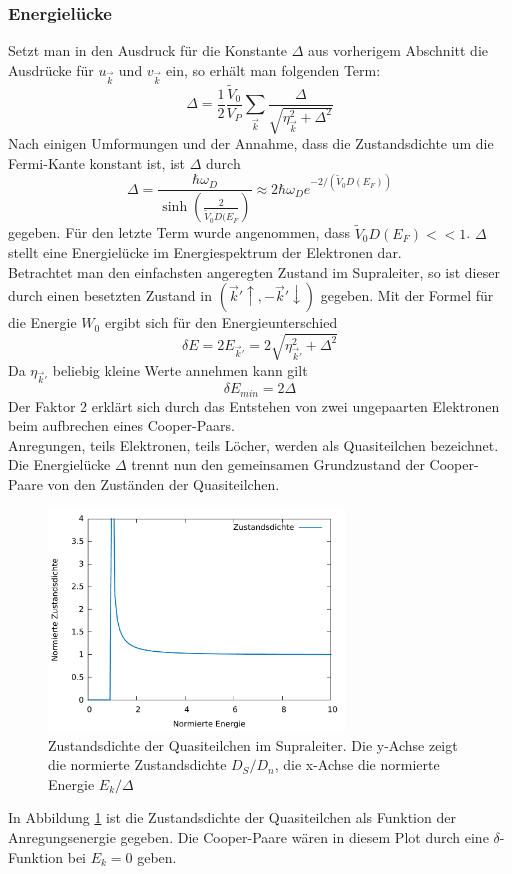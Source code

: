 		\subsubsection{Energielücke}
Setzt man in den Ausdruck für die Konstante $\Delta$ aus vorherigem Abschnitt die
Ausdrücke für $u_{\vec{k}}$ und $v_{\vec{k}}$ ein, so erhält man folgenden Term:
\[
	\Delta = \frac{1}{2} \frac{\tilde{V}_0}{V_P} \sum_{\vec{k}} 
			 \frac{\Delta}{\sqrt{\eta_{\vec{k}}^2 + \Delta^2}}
\]
Nach einigen Umformungen und der Annahme, dass die Zustandsdichte um die Fermi-Kante
konstant ist, ist $\Delta$ durch
\[
	\Delta = \frac{\hbar \omega_D}{\sinh \left( \frac{2}{\tilde{V}_0 D(E_F} \right)}
		   \approx 2 \hbar \omega_D e^{-2 / (\tilde{V}_0 D(E_F))}
\]
gegeben. Für den letzte Term wurde angenommen, dass $\tilde{V}_0 D(E_F) << 1$. 
$\Delta$ stellt eine Energielücke im Energiespektrum der Elektronen dar.\\
Betrachtet man den einfachsten angeregten Zustand im Supraleiter, so ist dieser
durch einen besetzten Zustand in $(\vec{k}' \uparrow, - \vec{k}' \downarrow)$
gegeben. Mit der Formel für die Energie $W_0$ ergibt sich für den 
Energieunterschied
\[
	\delta E = 2 E_{\vec{k}'} = 2 \sqrt{\eta_{\vec{k}'}^2 + \Delta^2}
\]
Da $\eta_{\vec{k}'}$ beliebig kleine Werte annehmen kann gilt 
\[
	\delta E_{min} = 2 \Delta
\]
Der Faktor 2 erklärt sich durch das Entstehen von zwei ungepaarten Elektronen
beim aufbrechen eines Cooper-Paars.\\
Anregungen, teils Elektronen, teils Löcher, werden als Quasiteilchen bezeichnet.
Die Energielücke $\Delta$ trennt nun den gemeinsamen Grundzustand der Cooper-Paare
von den Zuständen der Quasiteilchen.
\begin{figure}[h]
	\centering
	\includegraphics[width=0.7\textwidth]{Abb/plotdos.pdf}
	\caption{Zustandsdichte der Quasiteilchen im Supraleiter. Die y-Achse zeigt 
			 die normierte Zustandsdichte $D_S/D_n$, die x-Achse die normierte
			 Energie $E_k/\Delta$}
	\label{plotdos}
\end{figure}
In Abbildung \ref{plotdos} ist die Zustandsdichte der Quasiteilchen als Funktion
der Anregungsenergie gegeben. Die Cooper-Paare wären in diesem Plot durch eine 
$\delta$-Funktion bei $E_k = 0$ geben. \cite{hunklinger}

